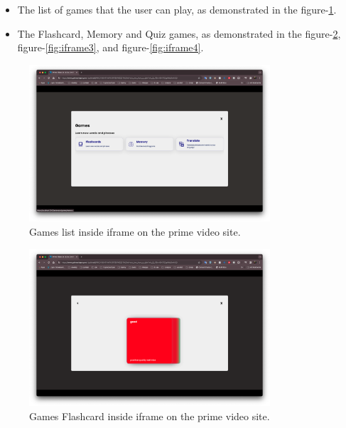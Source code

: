 \documentclass[12pt]{article}
\begin{document}
    \begin{itemize}
    \item The list of games that the user can play, as demonstrated in the figure-\ref{fig:iframe1}.
    \item The Flashcard, Memory and Quiz games, as demonstrated in the figure-\ref{fig:iframe2}, figure-\ref{fig:iframe3}, and figure-\ref{fig:iframe4}.
    \end{itemize}


    \begin{figure}[h]
      \centering
      \caption{
      Games list inside iframe on the prime video site.
      }
      \label{fig:iframe1}
      \includegraphics[width=0.8\textwidth]{assets/9.png}
    \end{figure}

    \begin{figure}[h]
      \centering
      \caption{
      Games Flashcard inside iframe on the prime video site.
      }
      \label{fig:iframe2}
      \includegraphics[width=0.8\textwidth]{assets/10.png}
    \end{figure}
\end{document}
